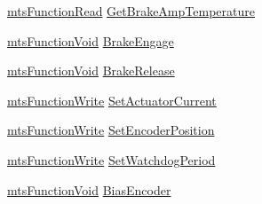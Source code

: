 \begin{DoxyCompactItemize}
\item 
\hyperlink{classmts_function_read}{mts\-Function\-Read} \hyperlink{structmts_robot_i_o1394_qt_widget_1_1_robot_struct_ac0a6317c6dd629a624943a7188cbd6f1}{Get\-Brake\-Amp\-Temperature}
\item 
\hyperlink{classmts_function_void}{mts\-Function\-Void} \hyperlink{structmts_robot_i_o1394_qt_widget_1_1_robot_struct_a78c8e3e577e97996959ab894ae1086ff}{Brake\-Engage}
\item 
\hyperlink{classmts_function_void}{mts\-Function\-Void} \hyperlink{structmts_robot_i_o1394_qt_widget_1_1_robot_struct_aa3bf0be8a4f616069a7e034c75a6d635}{Brake\-Release}
\item 
\hyperlink{classmts_function_write}{mts\-Function\-Write} \hyperlink{structmts_robot_i_o1394_qt_widget_1_1_robot_struct_a4a42aa88af8c06697fe9331bb6889dc0}{Set\-Actuator\-Current}
\item 
\hyperlink{classmts_function_write}{mts\-Function\-Write} \hyperlink{structmts_robot_i_o1394_qt_widget_1_1_robot_struct_a70dc86de257b6f14358323f985f07b8a}{Set\-Encoder\-Position}
\item 
\hyperlink{classmts_function_write}{mts\-Function\-Write} \hyperlink{structmts_robot_i_o1394_qt_widget_1_1_robot_struct_a596d925a30141dfde20884ed7a778f42}{Set\-Watchdog\-Period}
\item 
\hyperlink{classmts_function_void}{mts\-Function\-Void} \hyperlink{structmts_robot_i_o1394_qt_widget_1_1_robot_struct_a7eb8ab9780edc452f89022eb19d3a4be}{Bias\-Encoder}
\end{DoxyCompactItemize}


